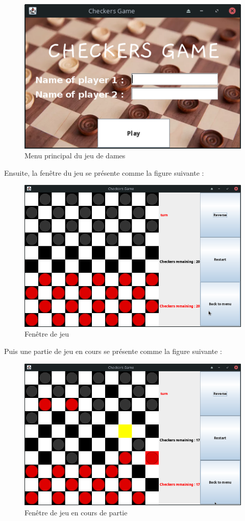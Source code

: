 \begin{figure}[H]
    \centering
    \includegraphics[width=0.8\columnwidth]{figures/mainMenu.png}
    \caption[Menu principal du jeu de dames]{Menu principal du jeu de dames}
    \label{f:menuPrincipall}
\end{figure}

Ensuite, la fenêtre du jeu se présente comme la figure suivante :

\begin{figure}[H]
    \centering
    \includegraphics[width=1\columnwidth]{figures/boardGame.png}
    \caption[Fenêtre de jeu]{Fenêtre de jeu}
    \label{f:fenetrePrincipalee}
\end{figure}

Puis une partie de jeu en cours se présente comme la figure suivante :

\begin{figure}[H]
    \centering
    \includegraphics[width=1\columnwidth]{figures/boardGameAdvanced.png}
    \caption[Fenêtre de jeu en cours de partie]{Fenêtre de jeu en cours de partie}
    \label{f:fenetreAvance}
\end{figure}